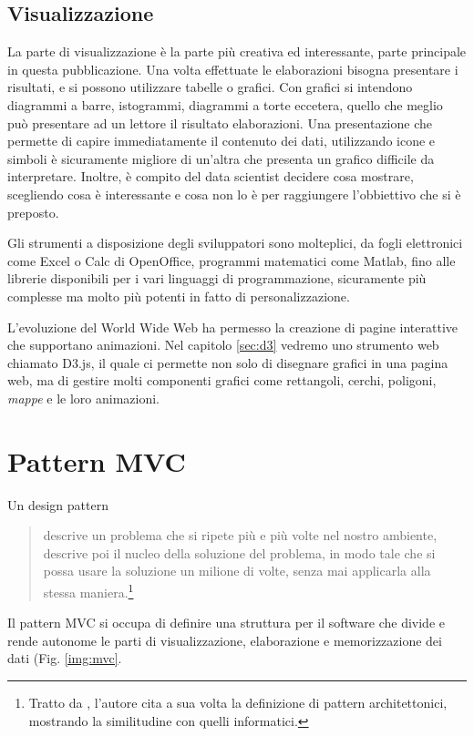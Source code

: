 \subsection{Visualizzazione}\label{sec:visualizzazione}
La parte di visualizzazione è la parte più creativa ed interessante, parte principale in questa pubblicazione. Una volta effettuate le elaborazioni bisogna presentare i risultati, e si possono utilizzare tabelle o grafici. Con grafici si intendono diagrammi a barre, istogrammi, diagrammi a torte eccetera, quello che meglio può presentare ad un lettore il risultato elaborazioni. Una presentazione che permette di capire immediatamente il contenuto dei dati, utilizzando icone e simboli è sicuramente migliore di un'altra che presenta un grafico difficile da interpretare. Inoltre, è compito del data scientist decidere cosa mostrare, scegliendo cosa è interessante e cosa non lo è per raggiungere l'obbiettivo che si è preposto.

Gli strumenti a disposizione degli sviluppatori sono molteplici, da fogli elettronici come Excel o Calc di OpenOffice, programmi matematici come Matlab, fino alle librerie disponibili per i vari linguaggi di programmazione, sicuramente più complesse ma molto più potenti in fatto di personalizzazione. 

L'evoluzione del World Wide Web ha permesso la creazione di pagine interattive che supportano animazioni. Nel capitolo \ref{sec:d3} vedremo uno strumento web chiamato D3.js, il quale ci permette non solo di disegnare grafici in una pagina web, ma di gestire molti componenti grafici come rettangoli, cerchi, poligoni, \emph{mappe} e le loro animazioni.






\section{Pattern MVC}\label{sec:mvc}
Un design pattern \begin{quote} descrive un problema che si ripete più e più volte nel nostro ambiente, descrive poi il nucleo della soluzione del problema, in modo tale che si possa usare la soluzione un milione di volte, senza mai applicarla alla stessa maniera.\footnote{Tratto da \cite[p. 2,3]{designpatterns}, l'autore cita a sua volta la definizione di pattern architettonici, mostrando la similitudine con quelli informatici.}\end{quote}

Il pattern MVC si occupa di definire una struttura per il software che divide e rende autonome le parti di visualizzazione, elaborazione e memorizzazione dei dati (Fig. \ref{img:mvc}.

